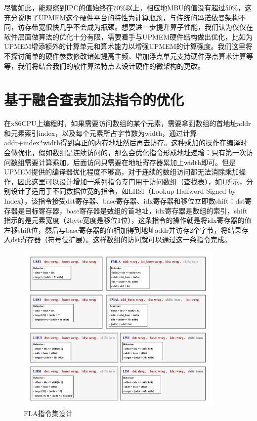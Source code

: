 尽管如此，能观察到IPC的值始终在70\%以上，相应地MBU的值没有超过50\%，这充分说明了UPMEM这个硬件平台的特性为计算瓶颈，与传统的冯诺依曼架构不同，访存带宽很快几乎不会成为瓶颈。想要进一步提升算子性能，我们认为仅仅在软件层面做算法的优化十分有限，需要着手与UPMEM硬件结构做出优化，比如为UPMEM增添额外的计算单元和算术能力以增强UPMEM的计算强度。我们这里将不探讨简单的硬件参数修改诸如提高主频、增加浮点单元支持硬件浮点算术计算等等，我们将结合我们的软件算法特点去设计硬件的微架构的更改。

\section{基于融合查表加法指令的优化}
在x86CPU上编程时，如果需要访问数组的某个元素，需要拿到数组的首地址addr和元素索引index，以及每个元素所占字节数为width，通过计算addr+index*width得到真正的内存地址然后再去访存。这种乘加的操作在编译时会做优化，假如数组是连续访问的，那么会优化指令形成地址递增：只有第一次访问数组需要计算乘加，后面访问只需要在地址寄存器累加上width即可。但是UPMEM提供的编译器优化程度不够高，对于连续的数组访问都无法消除乘加操作，因此这里可以设计增加一系列指令专门用于访问数组（查找表），如\ref{LUTInst}所示，分别设计了适用于不同数据位宽的指令，如LHSI（Lookup Halfword Signed by Index），该指令接受dst寄存器、base寄存器、idx寄存器和移位立即数shift：dst寄存器是目标寄存器，base寄存器是数组的首地址，idx寄存器是数组的索引，shift指示的是元素宽度（2byte宽度是移位1位），这条指令的操作就是将idx寄存器的值左移shift位，然后与base寄存器的值相加得到地址addr并访存2个字节，将结果存入dst寄存器（符号位扩展）。这样数组的访问就可以通过这一条指令完成。

\begin{figure}[!htbp]
	\centering
    \includegraphics[width=0.9\textwidth]{figures/LUTInst.pdf}
	\caption{FLA指令集设计}
    \label{LUTInst}
\end{figure}

